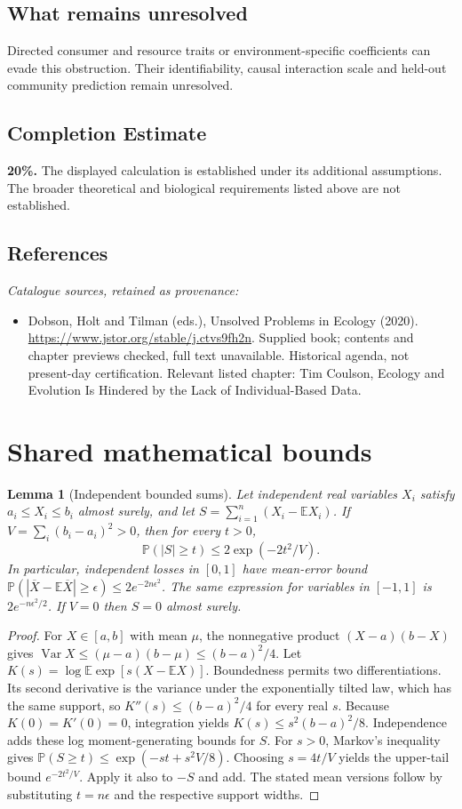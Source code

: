 \documentclass[11pt]{article}
\newcommand{\E}{\mathbb E}
\newcommand{\Prob}{\mathbb P}
\DeclareMathOperator{\Var}{Var}
\providecommand{\E}{\mathbb E}
\providecommand{\Prob}{\mathbb P}
\providecommand{\Var}{\operatorname{Var}}
\newtheorem{sharedlemma}{Lemma}[section]
\begin{document}
\subsection{What remains unresolved}
Directed consumer and resource traits or environment-specific coefficients can evade this obstruction. Their identifiability, causal interaction scale and held-out community prediction remain unresolved.
\subsection{Completion Estimate}
\textbf{20\%.} The displayed calculation is established under its additional assumptions. The broader theoretical and biological requirements listed above are not established.
\subsection{References}
\noindent\emph{Catalogue sources, retained as provenance:}
\begin{itemize}
\item Dobson, Holt and Tilman (eds.), Unsolved Problems in Ecology (2020). \url{https://www.jstor.org/stable/j.ctvs9fh2n}. Supplied book; contents and chapter previews checked, full text unavailable. Historical agenda, not present-day certification. Relevant listed chapter: Tim Coulson, Ecology and Evolution Is Hindered by the Lack of Individual-Based Data.
\end{itemize}
\clearpage


\appendix
\section{Shared mathematical bounds}\label{app:bounds}
\begin{sharedlemma}[Independent bounded sums]\label{lem:bounded}
Let independent real variables $X_i$ satisfy $a_i\leq X_i\leq b_i$ almost surely,
and let $S=\sum_{i=1}^n(X_i-\E X_i)$. If
$V=\sum_i(b_i-a_i)^2>0$, then for every $t>0$,
\[
 \Prob(|S|\geq t)\leq 2\exp(-2t^2/V).
\]
In particular, independent losses in $[0,1]$ have mean-error bound
$\Prob(|\overline X-\E\overline X|\geq\epsilon)
\leq2e^{-2n\epsilon^2}$. The same expression for variables in $[-1,1]$
is $2e^{-n\epsilon^2/2}$. If $V=0$ then $S=0$ almost surely.
\end{sharedlemma}
\begin{proof}
For $X\in[a,b]$ with mean $\mu$, the nonnegative product
$(X-a)(b-X)$ gives
$\Var X\leq(\mu-a)(b-\mu)\leq(b-a)^2/4$.
Let $K(s)=\log\E\exp[s(X-\E X)]$.
Boundedness permits two differentiations. Its second derivative is the variance
under the exponentially tilted law, which has the same support, so
$K''(s)\leq(b-a)^2/4$ for every real $s$.
Because $K(0)=K'(0)=0$, integration yields
$K(s)\leq s^2(b-a)^2/8$.
Independence adds these log moment-generating bounds for $S$.
For $s>0$, Markov's inequality gives
$\Prob(S\geq t)\leq\exp(-st+s^2V/8)$.
Choosing $s=4t/V$ yields the upper-tail bound $e^{-2t^2/V}$.
Apply it also to $-S$ and add. The stated mean versions follow by substituting
$t=n\epsilon$ and the respective support widths.
\end{proof}
\end{document}
